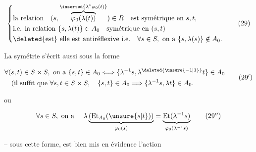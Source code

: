 \[
 \left\{\begin{aligned}
 &\text{la relation}\quad(s,\overset{\inserted{\lambda^*\varphi_0(t)}}{\overbrace{\varphi_0(\lambda(t))}})\in R
     \quad\text{est symétrique en }s,t,\\
 &\text{i.e. la relation }\{s,\lambda(t)\}\in A_0\quad\text{symétrique en }(s,t)\\
 &\deleted{\text{est}}\ \text{elle est antiréflexive i.e.}\quad
       \forall s\in S,\ \text{on a }\{s,\lambda(s)\}\notin A_0.
 \end{aligned}\right. \tag*{(29)}
\]

La symétrie s'écrit aussi sous la forme

\[
 \begin{aligned}
 &\forall(s,t)\in S\times S,\ \text{on a }\{s,t\}\in A_0
 \Longleftrightarrow\{\lambda^{-1}s,\lambda^{\deleted{\unsure{-1|1}}}t\}\in A_0\\
 &\quad(\text{il suffit que }\forall s,t\in S\times S,\quad
 \{s,t\}\in A_0\Longrightarrow\{\lambda^{-1}s,\lambda t\}\in A_0 .
 \end{aligned}\tag*{$(29')$}
\]

 ou 

\[
 \forall s\in S,\ \text{on a }\quad
 \lambda\underbrace{(\mathrm{Et}_{A_0}(\unsure{s|t}))}_{\varphi_0(s)}
 =\underbrace{\mathrm{Et}(\lambda^{-1}s)}_{\varphi_0(\lambda^{-1}s)} \tag*{$(29'')$}
\]

-- sous cette forme, est bien mis en évidence l'action

